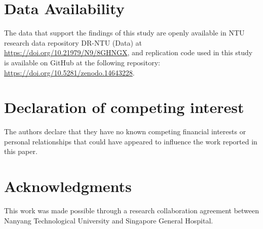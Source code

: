 \section*{Data Availability}
The data that support the findings of this study are openly available in NTU research data repository DR-NTU (Data) at \url{https://doi.org/10.21979/N9/8GHNGX}, and replication code used in this study is available on GitHub at the following repository: \href{https://doi.org/10.5281/zenodo.14643228}{https://doi.org/10.5281/zenodo.14643228}.

\section*{Declaration of competing interest}
The authors declare that they have no known competing financial interests or personal relationships that could have appeared to influence the work reported in this paper.

\section*{Acknowledgments}
This work was made possible through a research collaboration agreement between Nanyang Technological University and Singapore General Hospital.

\printcredits

